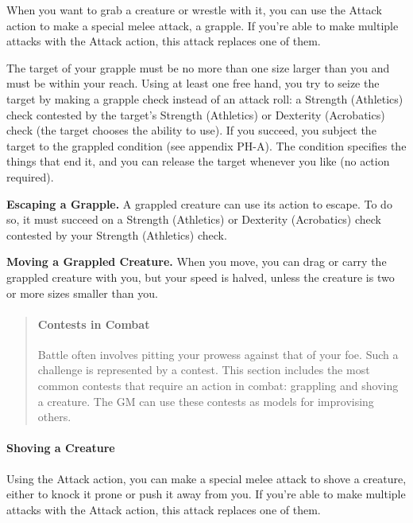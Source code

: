 \documentclass[
]{article}
\begin{document}
When you want to grab a creature or wrestle with it, you can use the
Attack action to make a special melee attack, a grapple. If you're able
to make multiple attacks with the Attack action, this attack replaces
one of them.

The target of your grapple must be no more than one size larger than you
and must be within your reach. Using at least one free hand, you try to
seize the target by making a grapple check instead of an attack roll: a
Strength (Athletics) check contested by the target's Strength
(Athletics) or Dexterity (Acrobatics) check (the target chooses the
ability to use). If you succeed, you subject the target to the grappled
condition (see appendix PH-A). The condition specifies the things that
end it, and you can release the target whenever you like (no action
required).

\textbf{Escaping a Grapple.} A grappled creature can use its action to
escape. To do so, it must succeed on a Strength (Athletics) or Dexterity
(Acrobatics) check contested by your Strength (Athletics) check.

\textbf{Moving a Grappled Creature.} When you move, you can drag or
carry the grappled creature with you, but your speed is halved, unless
the creature is two or more sizes smaller than you.

\begin{quote}
\mbox{}%
\hypertarget{contests-in-combat}{%
\paragraph{Contests in Combat}\label{contests-in-combat}}

Battle often involves pitting your prowess against that of your foe.
Such a challenge is represented by a contest. This section includes the
most common contests that require an action in combat: grappling and
shoving a creature. The GM can use these contests as models for
improvising others.
\end{quote}

\hypertarget{shoving-a-creature}{%
\paragraph{Shoving a Creature}\label{shoving-a-creature}}

Using the Attack action, you can make a special melee attack to shove a
creature, either to knock it prone or push it away from you. If you're
able to make multiple attacks with the Attack action, this attack
replaces one of them.
\end{document}
